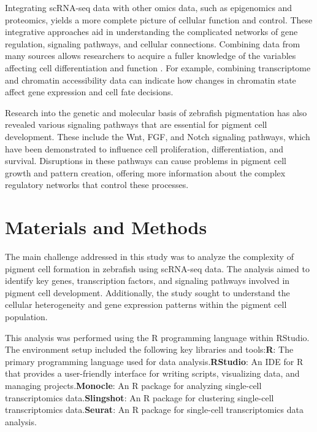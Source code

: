 \documentclass[runningheads]{llncs}
\begin{document}
Integrating scRNA-seq data with other omics data, such as epigenomics and proteomics, yields a more complete picture of cellular function and control. These integrative approaches aid in understanding the complicated networks of gene regulation, signaling pathways, and cellular connections. Combining data from many sources allows researchers to acquire a fuller knowledge of the variables affecting cell differentiation and function \cite{stuart2019comprehensive,jang2021epigenetic}. For example, combining transcriptome and chromatin accessibility data can indicate how changes in chromatin state affect gene expression and cell fate decisions.

Research into the genetic and molecular basis of zebrafish pigmentation has also revealed various signaling pathways that are essential for pigment cell development. These include the Wnt, FGF, and Notch signaling pathways, which have been demonstrated to influence cell proliferation, differentiation, and survival\cite{budi2008embryonic}. Disruptions in these pathways can cause problems in pigment cell growth and pattern creation, offering more information about the complex regulatory networks that control these processes\cite{camargo2019endothelin}.

\section{Materials and Methods}
The main challenge addressed in this study was to analyze the complexity of pigment cell formation in zebrafish using scRNA-seq data. The analysis aimed to identify key genes, transcription factors, and signaling pathways involved in pigment cell development. Additionally, the study sought to understand the cellular heterogeneity and gene expression patterns within the pigment cell population.

This analysis was performed using the R programming language within RStudio. The environment setup included the following key libraries and tools:\newline\textbf{R}: The primary programming language used for data analysis.\newline\textbf{RStudio}: An IDE for R that provides a user-friendly interface for writing scripts, visualizing data, and managing projects.\newline\textbf{Monocle}: An R package for analyzing single-cell transcriptomics data.\newline\textbf{Slingshot}: An R package for clustering single-cell transcriptomics data.\newline\textbf{Seurat}: An R package for single-cell transcriptomics data analysis.
\end{document}
